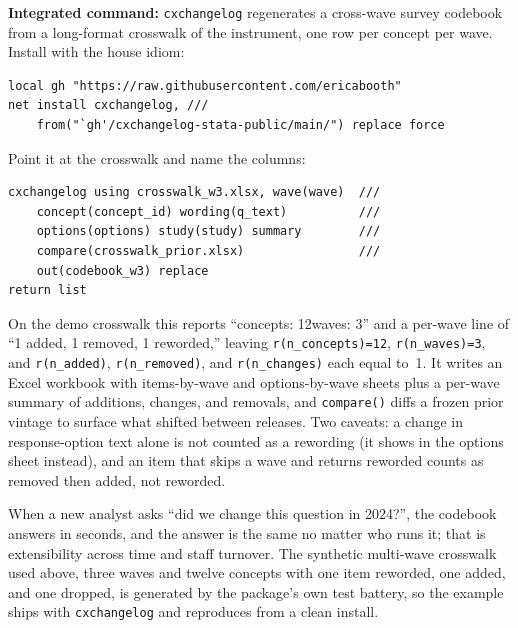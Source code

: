 \documentclass[
    a4paper,
    fontsize=10pt,
    twoside=true,
    numbers=noenddot,
]{kaobook}
\begin{document}
\begin{kaobox}[frametitle=Package Integration: \texttt{cxchangelog}]
\textbf{Integrated command:} \texttt{cxchangelog} regenerates a cross-wave survey codebook from a long-format crosswalk of the instrument, one row per concept per wave. Install with the house idiom:
\par
{\footnotesize
\begin{verbatim}
local gh "https://raw.githubusercontent.com/ericabooth"
net install cxchangelog, ///
    from("`gh'/cxchangelog-stata-public/main/") replace force
\end{verbatim}
}
Point it at the crosswalk and name the columns:
\par
{\footnotesize
\begin{verbatim}
cxchangelog using crosswalk_w3.xlsx, wave(wave)  ///
    concept(concept_id) wording(q_text)          ///
    options(options) study(study) summary        ///
    compare(crosswalk_prior.xlsx)                ///
    out(codebook_w3) replace
return list
\end{verbatim}
}
On the demo crosswalk this reports \enquote{concepts: 12\quad waves: 3} and a per-wave line of \enquote{1 added, 1 removed, 1 reworded,} leaving \texttt{r(n\_concepts)=12}, \texttt{r(n\_waves)=3}, and \texttt{r(n\_added)}, \texttt{r(n\_removed)}, and \texttt{r(n\_changes)} each equal to~1. It writes an Excel workbook with items-by-wave and options-by-wave sheets plus a per-wave summary of additions, changes, and removals, and \texttt{compare()} diffs a frozen prior vintage to surface what shifted between releases. Two caveats: a change in response-option text alone is not counted as a rewording (it shows in the options sheet instead), and an item that skips a wave and returns reworded counts as removed then added, not reworded.
\end{kaobox}

When a new analyst asks \enquote{did we change this question in 2024?}, the codebook answers in seconds, and the answer is the same no matter who runs it; that is extensibility across time and staff turnover. The synthetic multi-wave crosswalk used above, three waves and twelve concepts with one item reworded, one added, and one dropped, is generated by the package's own test battery, so the example ships with \texttt{cxchangelog} and reproduces from a clean install.
\end{document}

